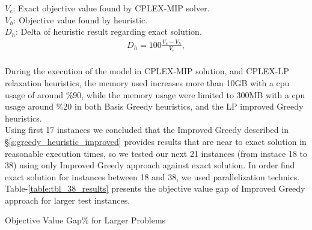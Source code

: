 \documentclass[11pt]{article}
\begin{document}
\noindent $V_{e}$: Exact objective value found by CPLEX-MIP solver. \\
\noindent $V_{h}$: Objective value found by heuristic. \\
\noindent $D_{h}$: Delta of heuristic result regarding exact solution. \\
\begin{align}
&D_{h} = 100 \frac{V_{e} - V_{h}}{V_{e}}, \label{exact_distance_formulation}&
\end{align}\\


During the execution of the model in CPLEX-MIP solution, and CPLEX-LP relaxation heuristics, the memory used increases more than 10GB with a cpu usage of around \%90, while the memory usage were limited to 300MB with a cpu usage around \%20 in both Basis Greedy heuristics, and the LP improved Greedy heuristics.\\

Using first 17 instances we concluded that the Improved Greedy described in \S \ref{s:greedy_heuristic_improved} provides results that are near to exact solution in reasonable execution times, so we tested our next 21 instances (from instace 18 to 38) using only Improved Greedy approach against exact solution. In order find exact solution for instances between 18 and 38, we used parallelization technics. Table-\ref{table:tbl_38_results} presents the objective value gap of Improved Greedy approach for larger test instances.

        \begin{table}[htb!]
        \centering
        \caption{Objective Value Gap\% for Larger Problems}\label{table:tbl_38_results}
        \end{table}
         \newpage
\end{document}
